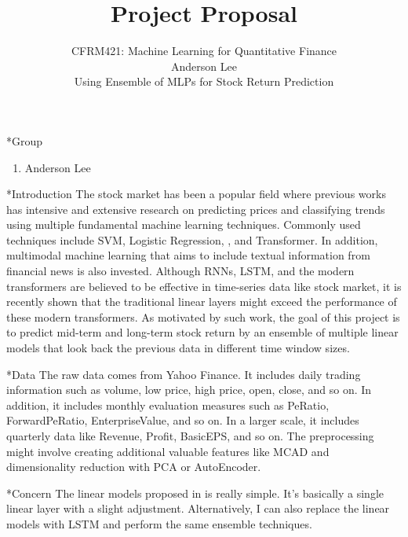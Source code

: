 \documentclass{article}
\date{{}}
\begin{document}
\title{Project Proposal}
\author{\normalsize{CFRM421: Machine Learning for Quantitative Finance}\\
\normalsize{Anderson Lee}\\
\normalsize{Using Ensemble of MLPs for Stock Return Prediction}}
\maketitle

\begin{section}*{Group}
  \begin{enumerate}[1.]
    \item Anderson Lee
  \end{enumerate}
\end{section}
\begin{section}*{Introduction}
  The stock market has been a popular field where previous works has intensive and extensive research on predicting prices and classifying trends using multiple fundamental machine learning techniques. Commonly used techniques include SVM\cite{DL, SVM-Log-LSTM}, Logistic Regression\cite{SVM-Log-LSTM}, \cite{LSTM-Multimodal-PM}, and Transformer\cite{Transformer}. In addition, multimodal machine learning that aims to include textual information from financial news is also invested.\cite{LSTM-event-driven} Although RNNs, LSTM, and the modern transformers are believed to be effective in time-series data like stock market, it is recently shown that the traditional linear layers might exceed the performance of these modern transformers.\cite{Outperform-transformer} As motivated by such work, the goal of this project is to predict mid-term and long-term stock return by an ensemble of multiple linear models that look back the previous data in different time window sizes.
\end{section}
\begin{section}*{Data}
  The raw data comes from Yahoo Finance. It includes daily trading information such as volume, low price, high price, open, close, and so on. In addition, it includes monthly evaluation measures such as PeRatio, ForwardPeRatio, EnterpriseValue, and so on. In a larger scale, it includes quarterly data like Revenue, Profit, BasicEPS, and so on. The preprocessing might involve creating additional valuable features like MCAD and dimensionality reduction with PCA or AutoEncoder.
\end{section}
\begin{section}*{Concern}
  The linear models proposed in \cite{Outperform-transformer} is really simple. It's basically a single linear layer with a slight adjustment. Alternatively, I can also replace the linear models with LSTM and perform the same ensemble techniques.
\end{section}
\end{document}
